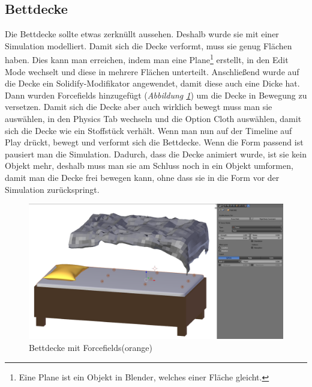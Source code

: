 \subsection{Bettdecke}
\label{bettdecke:ref1}
Die Bettdecke sollte etwas zerknüllt aussehen. Deshalb wurde sie mit einer Simulation modelliert. Damit sich die Decke verformt, muss sie genug Flächen haben.
Dies kann man erreichen, indem man eine Plane\footnote{Eine Plane ist ein Objekt in Blender, welches einer Fläche gleicht.} erstellt, in den Edit Mode wechselt und diese in mehrere Flächen unterteilt.
Anschließend wurde auf die Decke ein Solidify-Modifikator angewendet, damit diese auch eine Dicke hat.
Dann wurden Forcefields hinzugefügt (\textit{Abbildung \ref{Bettdecke:image1}}) um die Decke in Bewegung zu versetzen.
Damit sich die Decke aber auch wirklich bewegt muss man sie auswählen,
in den Physics Tab wechseln und die Option Cloth auswählen, damit sich die Decke wie ein Stoffstück verhält.
Wenn man nun auf der Timeline auf Play drückt, bewegt und verformt sich die Bettdecke.
Wenn die Form passend ist pausiert man die Simulation. Dadurch, dass die Decke animiert wurde, ist sie kein Objekt mehr, deshalb muss man sie
am Schluss noch in ein Objekt umformen, damit man die Decke frei bewegen kann, ohne dass sie in die Form vor der Simulation zurückspringt.

\begin{figure}[H]
    \centering
    \includegraphics[width=.8\textwidth]{images/Bettdecke_Forcefields.png}
    \caption{Bettdecke mit Forcefields(orange)}
    \label{Bettdecke:image1}
\end{figure}
\flushbottom